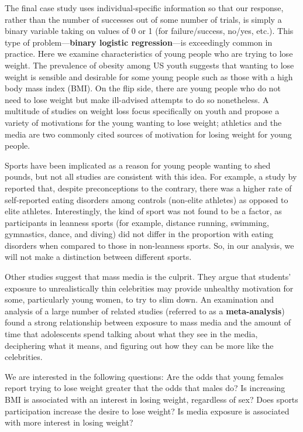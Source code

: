 \documentclass[
]{krantz}
\begin{document}
The final case study uses individual-specific information so that our response, rather than the number of successes out of some number of trials, is simply a binary variable taking on values of 0 or 1 (for failure/success, no/yes, etc.). This type of problem---\textbf{binary logistic regression}---is exceedingly common in practice. Here we examine characteristics of young people who are trying to lose weight. The prevalence of obesity among US youth suggests that wanting to lose weight is sensible and desirable for some young people such as those with a high body mass index (BMI). On the flip side, there are young people who do not need to lose weight but make ill-advised attempts to do so nonetheless. A multitude of studies on weight loss focus specifically on youth and propose a variety of motivations for the young wanting to lose weight; athletics and the media are two commonly cited sources of motivation for losing weight for young people.

Sports have been implicated as a reason for young people wanting to shed pounds, but not all studies are consistent with this idea. For example, a study by \citet{Martinsen2009} reported that, despite preconceptions to the contrary, there was a higher rate of self-reported eating disorders among controls (non-elite athletes) as opposed to elite athletes. Interestingly, the kind of sport was not found to be a factor, as participants in leanness sports (for example, distance running, swimming, gymnastics, dance, and diving) did not differ in the proportion with eating disorders when compared to those in non-leanness sports. So, in our analysis, we will not make a distinction between different sports.

Other studies suggest that mass media is the culprit. They argue that students' exposure to unrealistically thin celebrities may provide unhealthy motivation for some, particularly young women, to try to slim down. An examination and analysis of a large number of related studies (referred to as a \textbf{meta-analysis}) \citep{Grabe2008} found a strong relationship between exposure to mass media and the amount of time that adolescents spend talking about what they see in the media, deciphering what it means, and figuring out how they can be more like the celebrities.

We are interested in the following questions: Are the odds that young females report trying to lose weight greater that the odds that males do? Is increasing BMI is associated with an interest in losing weight, regardless of sex? Does sports participation increase the desire to lose weight? Is media exposure is associated with more interest in losing weight?
\end{document}
